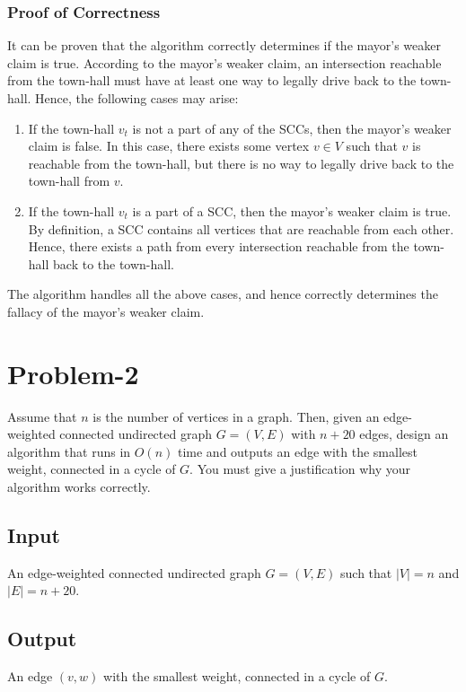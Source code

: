 \documentclass[12pt]{report}
\begin{document}
    \subsubsection*{Proof of Correctness}
    It can be proven that the algorithm correctly determines if the mayor's weaker claim is true.
    According to the mayor's weaker claim, an intersection reachable from the town-hall must have at least one way to legally drive back to the town-hall.
    Hence, the following cases may arise:
    \begin{enumerate}
        \item
        If the town-hall $v_{t}$ is not a part of any of the SCCs, then the mayor's weaker claim is false.
        In this case, there exists some vertex $v \in V$ such that $v$ is reachable from the town-hall, but there is no way to legally drive back to the town-hall from $v$.
        \item
        If the town-hall $v_{t}$ is a part of a SCC, then the mayor's weaker claim is true.
        By definition, a SCC contains all vertices that are reachable from each other.
        Hence, there exists a path from every intersection reachable from the town-hall back to the town-hall.
    \end{enumerate}
    The algorithm handles all the above cases, and hence correctly determines the fallacy of the mayor's weaker claim.

    \pagebreak

    \section*{\huge{Problem-2}}
    Assume that $n$ is the number of vertices in a graph.
    Then, given an edge-weighted connected undirected graph $G = (V, E)$ with $n + 20$ edges, design an algorithm that runs in $O(n)$
    time and outputs an edge with the smallest weight, connected in a cycle of $G$.
    You must give a justification why your algorithm works correctly.

    \subsection*{Input}
    An edge-weighted connected undirected graph $G = (V, E)$ such that $|V| = n$ and $|E| = n + 20$.

    \subsection*{Output}
    An edge $(v, w)$ with the smallest weight, connected in a cycle of $G$.
\end{document}
